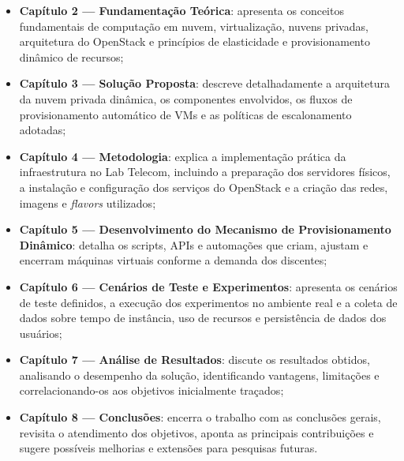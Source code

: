 \begin{itemize}
    \item \textbf{Capítulo 2 — Fundamentação Teórica}: apresenta os conceitos fundamentais de computação em nuvem, virtualização, nuvens privadas, arquitetura do OpenStack e princípios de elasticidade e provisionamento dinâmico de recursos;
    \item \textbf{Capítulo 3 — Solução Proposta}: descreve detalhadamente a arquitetura da nuvem privada dinâmica, os componentes envolvidos, os fluxos de provisionamento automático de VMs e as políticas de escalonamento adotadas;
    \item \textbf{Capítulo 4 — Metodologia}: explica a implementação prática da infraestrutura no Lab Telecom, incluindo a preparação dos servidores físicos, a instalação e configuração dos serviços do OpenStack e a criação das redes, imagens e \textit{flavors} utilizados;
    \item \textbf{Capítulo 5 — Desenvolvimento do Mecanismo de Provisionamento Dinâmico}: detalha os scripts, APIs e automações que criam, ajustam e encerram máquinas virtuais conforme a demanda dos discentes;
    \item \textbf{Capítulo 6 — Cenários de Teste e Experimentos}: apresenta os cenários de teste definidos, a execução dos experimentos no ambiente real e a coleta de dados sobre tempo de instância, uso de recursos e persistência de dados dos usuários;
    \item \textbf{Capítulo 7 — Análise de Resultados}: discute os resultados obtidos, analisando o desempenho da solução, identificando vantagens, limitações e correlacionando-os aos objetivos inicialmente traçados;
    \item \textbf{Capítulo 8 — Conclusões}: encerra o trabalho com as conclusões gerais, revisita o atendimento dos objetivos, aponta as principais contribuições e sugere possíveis melhorias e extensões para pesquisas futuras.
\end{itemize}
